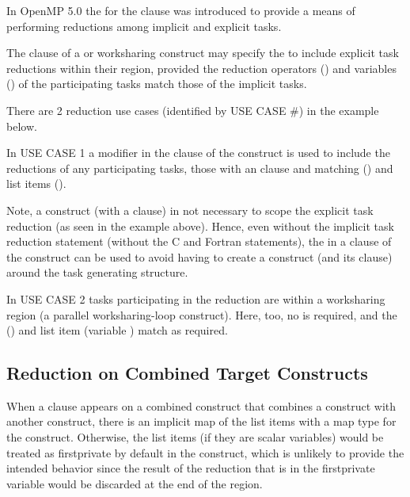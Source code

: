 
In OpenMP 5.0 the   for the  clause was
introduced to provide a means of performing reductions among implicit and explicit tasks.

The  clause of a  or worksharing construct may
specify the   to include explicit task reductions
within their region, provided the reduction operators ()
and variables () of the participating tasks match those of the
implicit tasks.

There are 2 reduction use cases (identified by USE CASE \#) in the  example below.  

In USE CASE 1 a  modifier in the  clause 
of the  construct is used to include the reductions of any 
participating tasks, those with an  clause and matching 
 (\code{+}) and list items ().  

Note, a  construct (with a  clause) in not
necessary to scope the explicit task reduction (as seen in the example above). 
Hence, even without the implicit task reduction statement (without the C   
and Fortran  statements), the   
in a  clause of the  construct
can be used to avoid having to create a  construct 
(and its  clause) around the task generating structure.

In USE CASE 2 tasks participating in the reduction are within a
worksharing region (a parallel worksharing-loop construct).
Here, too, no  is required, and the  (\code{+})
and list item (variable ) match as required.





\subsection{Reduction on Combined Target Constructs}
\label{subsec:target_reduction}

When a  clause appears on a combined construct that combines 
a  construct with another construct, there is an implicit map 
of the list items with a  map type for the  construct. 
Otherwise, the list items (if they are scalar variables) would be 
treated as firstprivate by default in the  construct, which 
is unlikely to provide the intended behavior since the result of the
reduction that is in the firstprivate variable would be discarded 
at the end of the  region.

